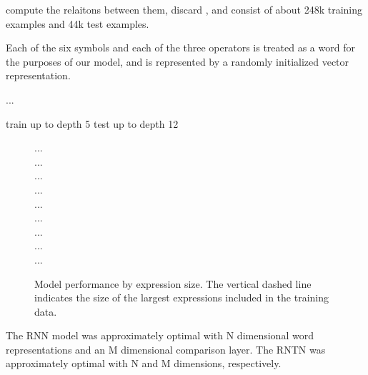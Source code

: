  compute the relaitons between them, discard  , and consist of about 248k training examples and 44k test examples.

 Each of the six symbols and each of the three operators is treated as a word for the purposes of our model, and is represented by a randomly initialized vector representation.





...



train up to depth 5
test up to depth 12


\begin{figure}[t]
\begin{center}
...\\
...\\
...\\
...\\
...\\
...\\
...\\
...\\
...\\
\end{center}

\caption{Model performance by expression size. The vertical dashed line indicates the size of the largest expressions included in the training data.  \label{prop-figure}} 
\end{figure}


The RNN model was approximately optimal with N dimensional word representations and an M dimensional comparison layer. The RNTN was approximately optimal with N and M dimensions, respectively.



